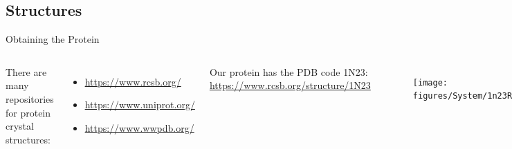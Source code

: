 \subsection{Structures}
\begin{frame}{Obtaining the Protein}
\begin{columns}
There are many repositories for protein crystal structures:
\begin{itemize}
	\item \href{https://www.rcsb.org/}{https://www.rcsb.org/}
	\item \href{https://www.uniprot.org/}{https://www.uniprot.org/}
	\item \href{https://www.wwpdb.org/}{https://www.wwpdb.org/}
\end{itemize}\vspace{1cm}

Our protein has the PDB code 1N23:
\href{https://www.rcsb.org/structure/1N23}{https://www.rcsb.org/structure/1N23}
\begin{figure}
\texttt{[image: figures/System/1n23Render.png]}
\end{figure}
\end{columns}
\end{frame}

